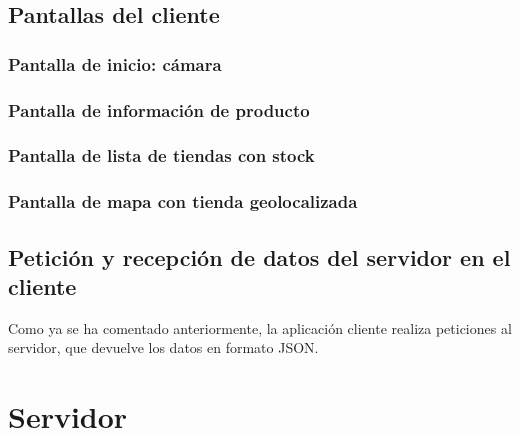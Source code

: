 \subsection{Pantallas del cliente}
 
\subsubsection{Pantalla de inicio: cámara}

\subsubsection{Pantalla de información de producto}

\subsubsection{Pantalla de lista de tiendas con stock}

\subsubsection{Pantalla de mapa con tienda geolocalizada}

\subsection{Petición y recepción de datos del servidor en el cliente}
Como ya se ha comentado anteriormente, la aplicación cliente realiza peticiones al servidor, que devuelve los datos en formato JSON.

\section{Servidor}

\chapterend